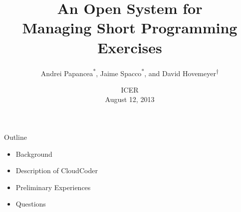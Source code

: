 \documentclass{beamer}
\begin{document}
\title[ICER 2013]{An Open System for\\
Managing Short Programming Exercises}
\author[Papancea et.\ al.]{Andrei Papancea\textsuperscript{*}, Jaime Spacco\textsuperscript{*}, and David Hovemeyer\textsuperscript{$\dagger$}}
\date[August, 2013]{ICER\\
August 12, 2013}

\begin{frame}[plain]
  \titlepage
\end{frame}

\begin{frame}{Outline}

\begin{itemize}
  \item Background
  \item Description of CloudCoder
  \item Preliminary Experiences
  \item Questions
\end{itemize}

\end{frame}
\end{document}

